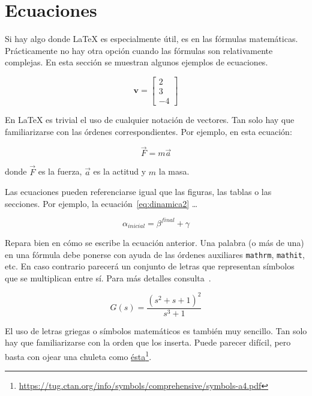 \section{Ecuaciones} 
\label{sec:ecuaciones}

Si hay algo donde \LaTeX{} es especialmente útil, es en las fórmulas matemáticas.  Prácticamente no hay otra opción cuando las fórmulas son relativamente complejas.  En esta sección se muestran algunos ejemplos de ecuaciones.

\begin{equation}
    \mathbf{v} = \left[
    \begin{array}{c}
        2 \\
        3 \\
        -4 
    \end{array}
    \right]
\end{equation}

En \LaTeX{} es trivial el uso de cualquier notación de vectores.  Tan solo hay que familiarizarse con las órdenes correspondientes.  Por ejemplo, en esta ecuación:

\begin{equation} 
\vec{F} = m \vec{a}
\label{eq:dinamica}
\end{equation}

\noindent donde $\vec{F}$ es la fuerza, $\vec{a}$ es la actitud y $m$ la masa.

Las ecuaciones pueden referenciarse igual que las figuras, las tablas o las secciones.  Por ejemplo, la ecuación~\ref{eq:dinamica2} \ldots

\begin{equation} 
\alpha_{\mathit{inicial}} = \beta^{\mathit{final}} + \gamma
\label{eq:dinamica2}
\end{equation}

Repara bien en cómo se escribe la ecuación anterior.  Una palabra (o más de una) en una fórmula debe ponerse con ayuda de las órdenes auxiliares \texttt{mathrm}, \texttt{mathit}, etc.  En caso contrario parecerá un conjunto de letras que representan símbolos que se multiplican entre sí.  Para más detalles consulta~\cite{andrewroberts2004}.

\begin{equation}
G(s)=\frac{(s^2+s+1)^2}{s^3+1}
\label{eq:dinamica3}
\end{equation}

El uso de letras griegas o símbolos matemáticos es también muy sencillo.  Tan solo hay que familiarizarse con la orden que los inserta.  Puede parecer difícil, pero basta con ojear una chuleta como \href{https://tug.ctan.org/info/symbols/comprehensive/symbols-a4.pdf}{ésta}\footnote{\url{https://tug.ctan.org/info/symbols/comprehensive/symbols-a4.pdf}}.

